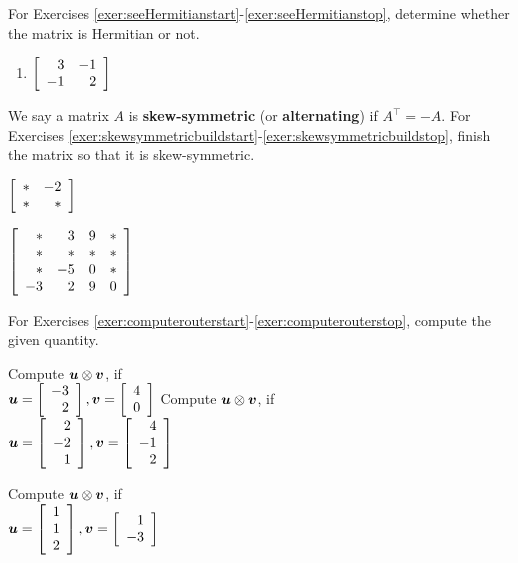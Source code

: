 \noindent For Exercises \ref{exer:seeHermitianstart}-\ref{exer:seeHermitianstop}, determine whether the matrix is Hermitian or not.
\begin{enumerate}[!HW!, label=$\spadesuit$ \arabic*., ref=\arabic*]
\item\label{exer:seeHermitianstop} $\mtx{rr}{3 & -1 \\ -1 & 2}$
\end{enumerate}

\noindent We say a matrix $A$ is \textbf{skew-symmetric} (or \textbf{alternating}) if $A^\top = -A$.  For Exercises \ref{exer:skewsymmetricbuildstart}-\ref{exer:skewsymmetricbuildstop}, finish the matrix so that it is skew-symmetric.
\begin{enumerate}[!HW!]
\begin{multicols}{2}
\item\label{exer:skewsymmetricbuildstart} $\mtx{rr}{\ast&-2\\\ast&\ast}$
\item\label{exer:skewsymmetricbuildstop} $\mtx{rrrr}{\ast&3&9&\ast\\\ast&\ast&\ast&\ast\\\ast&-5&0&\ast\\-3&2&9&0}$
\end{multicols}
\end{enumerate}

\noindent For Exercises \ref{exer:computerouterstart}-\ref{exer:computerouterstop}, compute the given quantity.
\begin{enumerate}[!HW!, label=$\spadesuit$ \arabic*., ref=\arabic*]
\begin{multicols}{3}
\item\label{exer:computerouterstart} Compute $\bb u\otimes \bb v$, if\\
$\bb u = \vr{-3\\2}, \bb v = \vr{4\\0}$\columnbreak
\itemspade Compute $\bb u\otimes \bb v$, if\\ $\bb u = \vr{2\\-2\\1}, \bb v = \vr{4\\-1\\2}$\columnbreak
\item\label{exer:computerouterstop} Compute $\bb u\otimes \bb v$, if\\ $\bb u = \vr{1\\1\\2}, \bb v = \vr{1\\-3}$
\end{multicols}
\end{enumerate}

